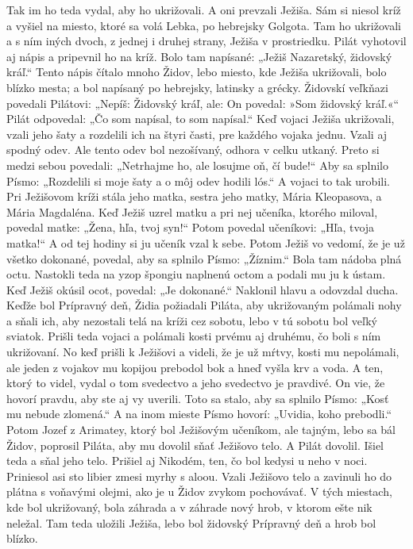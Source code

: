 Tak im ho teda vydal, aby ho ukrižovali. A oni prevzali Ježiša.
\versseparator
Sám si niesol kríž a vyšiel na miesto, ktoré sa volá Lebka, po hebrejsky Golgota. Tam ho ukrižovali a s ním iných dvoch, z jednej i druhej strany, Ježiša v prostriedku. Pilát vyhotovil aj nápis a pripevnil ho na kríž. Bolo tam napísané: „Ježiš Nazaretský, židovský kráľ.“ Tento nápis čítalo mnoho Židov, lebo miesto, kde Ježiša ukrižovali, bolo blízko mesta; a bol napísaný po hebrejsky, latinsky a grécky. Židovskí veľkňazi povedali Pilátovi: „Nepíš: Židovský kráľ, ale: On povedal: »Som židovský kráľ.«“ Pilát odpovedal: „Čo som napísal, to som napísal.“
\versseparator
Keď vojaci Ježiša ukrižovali, vzali jeho šaty a rozdelili ich na štyri časti, pre každého vojaka jednu. Vzali aj spodný odev. Ale tento odev bol nezošívaný, odhora v celku utkaný. 
Preto si medzi sebou povedali: „Netrhajme ho, ale losujme oň, čí bude!“ Aby sa splnilo Písmo:
„Rozdelili si moje šaty
a o môj odev hodili lós.“
A vojaci to tak urobili.
\versseparator
Pri Ježišovom kríži stála jeho matka, sestra jeho matky, Mária Kleopasova, a Mária Magdaléna. Keď Ježiš uzrel matku a pri nej učeníka, ktorého miloval, povedal matke: „Žena, hľa, tvoj syn!“ Potom povedal učeníkovi: „Hľa, tvoja matka!“ A od tej hodiny si ju učeník vzal k sebe.
\versseparator
Potom Ježiš vo vedomí, že je už všetko dokonané, povedal, aby sa splnilo Písmo: „Žíznim.“ 
Bola tam nádoba plná octu. Nastokli teda na yzop špongiu naplnenú octom a podali mu ju k ústam. Keď Ježiš okúsil ocot, povedal: „Je dokonané.“ Naklonil hlavu a odovzdal ducha.
\versseparator
Keďže bol Prípravný deň, Židia požiadali Piláta, aby ukrižovaným polámali nohy a sňali ich, aby nezostali telá na kríži cez sobotu, lebo v tú sobotu bol veľký sviatok. Prišli teda vojaci a polámali kosti prvému aj druhému, čo boli s ním ukrižovaní. No keď prišli k Ježišovi a videli, že je už mŕtvy, kosti mu nepolámali, 
ale jeden z vojakov mu kopijou prebodol bok a hneď vyšla krv a voda. A ten, ktorý to videl, vydal o tom svedectvo a jeho svedectvo je pravdivé. On vie, že hovorí pravdu, aby ste aj vy uverili. 
Toto sa stalo, aby sa splnilo Písmo: „Kosť mu nebude zlomená.“ 
A na inom mieste Písmo hovorí: „Uvidia, koho prebodli.“
\versseparator
Potom Jozef z Arimatey, ktorý bol Ježišovým učeníkom, ale tajným, lebo sa bál Židov, poprosil Piláta, aby mu dovolil sňať Ježišovo telo. A Pilát dovolil. Išiel teda a sňal jeho telo. Prišiel aj Nikodém, ten, čo bol kedysi u neho v noci. Priniesol asi sto libier zmesi myrhy s aloou. Vzali Ježišovo telo a zavinuli ho do plátna s voňavými olejmi, ako je u Židov zvykom pochovávať. V tých miestach, kde bol ukrižovaný, bola záhrada a v záhrade nový hrob, v ktorom ešte nik neležal. 
Tam teda uložili Ježiša, lebo bol židovský Prípravný deň a hrob bol blízko.
